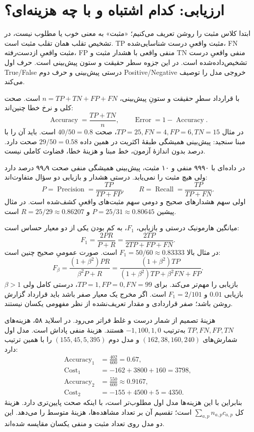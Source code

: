 \documentclass[12pt,a4paper,oneside]{report}
\begin{document}
\section{ارزیابی: کدام اشتباه و با چه هزینه‌ای؟}

ابتدا کلاس مثبت را روشن تعریف می‌کنیم؛ «مثبت» به معنی خوب یا مطلوب نیست، در تشخیص تقلب همان تقلب مثبت است. TP مثبت واقعیِ درست شناسایی‌شده، FN مثبت واقعیِ ازدست‌رفته، FP منفی واقعی با هشدار مثبت و TN منفی واقعیِ درست تشخیص‌داده‌شده است. در این جزوه سطر حقیقت و ستون پیش‌بینی است. حرف اول True/False درستی پیش‌بینی و حرف دوم Positive/Negative خروجی مدل را توصیف می‌کند.

با قرارداد سطرِ حقیقت و ستونِ پیش‌بینی، $n=TP+TN+FP+FN$ است. صحت کلی و نرخ خطا چنین‌اند:
\[\operatorname{Accuracy}=\frac{TP+TN}{n},\qquad \operatorname{Error}=1-\operatorname{Accuracy}.\]
در مثال $TP=25,FN=4,FP=6,TN=15$، صحت $40/50=0.8$ است. باید آن را با مبنا سنجید: پیش‌بینی همیشگی طبقهٔ اکثریت در همین داده $29/50=0.58$ صحت دارد. درصد بدون اندازهٔ آزمون، خط مبنا و هزینهٔ خطا، قضاوت کاملی نیست.

در داده‌ای با ۹۹۹۰ منفی و ۱۰ مثبت، پیش‌بینی همیشگی منفی صحت ۹۹٫۹ درصد دارد ولی هیچ مثبت را نمی‌یابد. درستی هشدار و بازیابی دو سؤال متفاوت‌اند:
\[P=\operatorname{Precision}=\frac{TP}{TP+FP},\qquad R=\operatorname{Recall}=\frac{TP}{TP+FN}.\]
اولی سهم هشدارهای صحیح و دومی سهم مثبت‌های واقعیِ کشف‌شده است. در مثال پیشین $P=25/31\approx0.80645$ و $R=25/29\approx0.86207$ است.

میانگین هارمونیک درستی و بازیابی، $F_1$، به کم بودن یکی از دو معیار حساس است:
\[F_1=\frac{2PR}{P+R}=\frac{2TP}{2TP+FP+FN}.\]
در مثال بالا $F_1=50/60\approx0.83333$ است. صورت عمومیِ صحیح چنین است:
\[F_\beta=\frac{(1+\beta^2)PR}{\beta^2P+R}=\frac{(1+\beta^2)TP}{(1+\beta^2)TP+\beta^2FN+FP}.\]
$\beta>1$ بازیابی را مهم‌تر می‌کند. برای $TP=1,FP=0,FN=99$، درستی کامل ولی بازیابی $0.01$ و $F_1=2/101$ است. اگر مخرج یک معیار صفر باشد باید قرارداد گزارش روشن باشد؛ صفر قراردادی و مقدار تعریف‌نشده از نظر مفهومی یکسان نیستند.

هزینهٔ تصمیم از شمار درست و غلط فراتر می‌رود. در اسلاید ۵۸، هزینه‌های $TP,FN,FP,TN$ به‌ترتیب $-1,100,1,0$ هستند. هزینهٔ منفی پاداش است. مدل اول شمارش‌های $(162,38,160,240)$ و مدل دوم $(155,45,5,395)$ را با همین ترتیب دارد:
\begin{align*}
\operatorname{Accuracy}_1&=\frac{402}{600}=0.67,\\
\operatorname{Cost}_1&=-162+3800+160=3798,\\
\operatorname{Accuracy}_2&=\frac{550}{600}\approx0.9167,\\
\operatorname{Cost}_2&=-155+4500+5=4350.
\end{align*}
بنابراین با این هزینه‌ها مدل اول مطلوب‌تر است، با اینکه صحت پایین‌تری دارد. هزینهٔ کل $\sum_{a,p}n_{a,p}c_{a,p}$ است؛ تقسیم آن بر تعداد مشاهده‌ها، هزینهٔ متوسط را می‌دهد. این دو مدل روی تعداد مثبت و منفی یکسان مقایسه شده‌اند.
\end{document}
